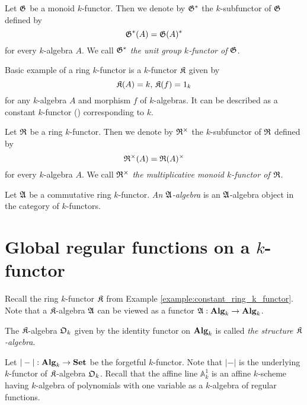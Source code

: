 \begin{example}\label{example:units_k_functor_for_a_monoid}
Let ${\mathfrak G}$ be a monoid $k$-functor. Then we denote by ${\mathfrak G}^*$ the $k$-subfunctor of ${\mathfrak G}$ defined by
$${\mathfrak G}^{*}(A) = {\mathfrak G}(A)^{*}$$
for every $k$-algebra $A$. We call ${\mathfrak G}^{*}$ \textit{the unit group $k$-functor of ${\mathfrak G}$}.
\end{example}

\begin{example}\label{example:constant_ring_k_functor}
Basic example of a ring $k$-functor is a $k$-functor $\mathfrak{K}$ given by
$${\mathfrak K}(A) = k,\,{\mathfrak K}(f) = 1_k$$
for any $k$-algebra $A$ and morphism $f$ of $k$-algebras. It can be described as a constant $k$-functor ({\cite[page 67]{Maclane}}) corresponding to $k$.
\end{example}

\begin{definition}
Let ${\mathfrak R}$ be a ring $k$-functor. Then we denote by ${\mathfrak R}^{\times}$ the $k$-subfunctor of ${\mathfrak R}$ defined by
$${\mathfrak R}^{\times}(A) = {\mathfrak R}(A)^{\times}$$
for every $k$-algebra $A$. We call ${\mathfrak R}^{\times}$ \textit{the multiplicative monoid $k$-functor of ${\mathfrak R}$}.
\end{definition}

\begin{definition}
Let ${\mathfrak A}$ be a commutative ring $k$-functor. \textit{An ${\mathfrak A}$-algebra} is an ${\mathfrak A}$-algebra object in the category of $k$-functors.
\end{definition}

\section{Global regular functions on a $k$-functor}
\noindent
Recall the ring $k$-functor ${\mathfrak K}$ from Example \ref{example:constant_ring_k_functor}. Note that a ${\mathfrak K}$-algebra ${\mathfrak A}$ can be viewed as a functor ${\mathfrak A}:\mathbf{Alg}_k\rightarrow \mathbf{Alg}_k$.

\begin{definition}
The ${\mathfrak K}$-algebra ${\mathfrak O}_k$ given by the identity functor on $\mathbf{Alg}_k$ is called \textit{the structure ${\mathfrak K}$-algebra}.
\end{definition}
\noindent
Let $|-|:\mathbf{Alg}_k\rightarrow \mathbf{Set}$ be the forgetful $k$-functor. Note that $|-|$ is the underlying $k$-functor of ${\mathfrak K}$-algebra ${\mathfrak O}_k$. Recall that the affine line $\mathbb{A}^1_k$ is an affine $k$-scheme having $k$-algebra of polynomials with one variable as a $k$-algebra of regular functions.

